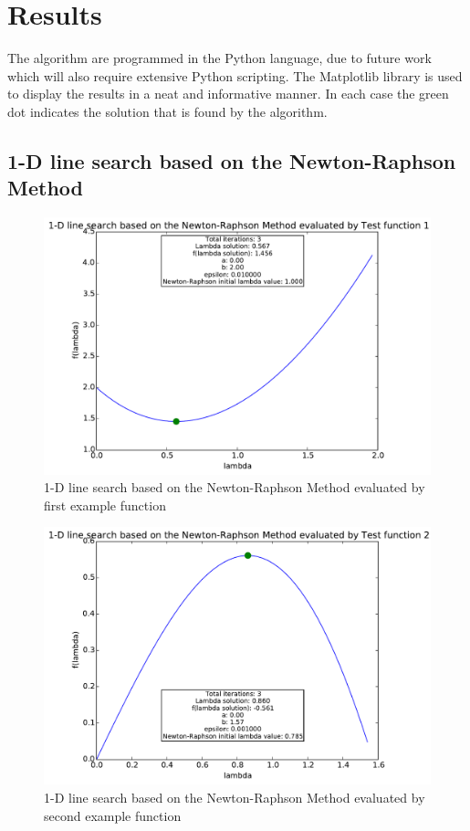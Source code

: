 \documentclass[a4paper,10pt]{article}
\begin{document}
\section{Results}
The algorithm are programmed in the Python language, due to future work which will also require extensive Python scripting. The Matplotlib library is used to display the results in a neat and informative manner. In each case the green dot indicates the solution that is found by the algorithm.

\newpage
\subsection{1-D line search based on the Newton-Raphson Method}
\begin{figure}[h]
\centering
 \includegraphics[scale=0.55]{./graphs/algorithm1/x_in_middel/testFunction1.pdf} 
 \caption{1-D line search based on the Newton-Raphson Method evaluated by first example function}
 \label{fig:alg1test1}
\end{figure}

\begin{figure}[h]
\centering
 \includegraphics[scale=0.55]{./graphs/algorithm1/x_in_middel/testFunction2.pdf} 
 \caption{1-D line search based on the Newton-Raphson Method evaluated by second example function}
 \label{fig:alg1test2}
\end{figure}
\end{document}
